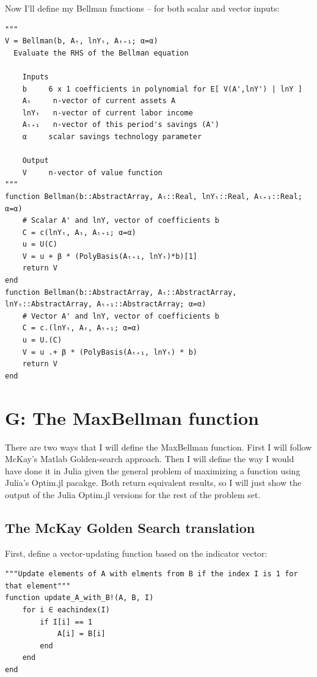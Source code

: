 \documentclass[12pt]{article}
\begin{document}
Now I'll define my Bellman functions -- for both scalar and vector inputs:

\begin{lstlisting}[language=JuliaLocal, style=julia]
"""
V = Bellman(b, Aₜ, lnYₜ, Aₜ₊₁; α=α)
  Evaluate the RHS of the Bellman equation

    Inputs
    b     6 x 1 coefficients in polynomial for E[ V(A',lnY') | lnY ]
    Aₜ     n-vector of current assets A
    lnYₜ   n-vector of current labor income
    Aₜ₊₁   n-vector of this period's savings (A')
    α     scalar savings technology parameter

    Output
    V     n-vector of value function
"""
function Bellman(b::AbstractArray, Aₜ::Real, lnYₜ::Real, Aₜ₊₁::Real; α=α)
    # Scalar A' and lnY, vector of coefficients b
    C = c(lnYₜ, Aₜ, Aₜ₊₁; α=α)
    u = U(C)
    V = u + β * (PolyBasis(Aₜ₊₁, lnYₜ)*b)[1]
    return V
end
function Bellman(b::AbstractArray, Aₜ::AbstractArray, lnYₜ::AbstractArray, Aₜ₊₁::AbstractArray; α=α)
    # Vector A' and lnY, vector of coefficients b
    C = c.(lnYₜ, Aₜ, Aₜ₊₁; α=α)
    u = U.(C)
    V = u .+ β * (PolyBasis(Aₜ₊₁, lnYₜ) * b)
    return V
end
\end{lstlisting}







\newpage
\section*{G: The MaxBellman function}
There are two ways that I will define the MaxBellman function. First I will follow McKay's Matlab Golden-search approach. Then I will define the way I would have done it in Julia given the general problem of maximizing a function using Julia's Optim.jl pacakge. Both return equivalent results, so I will just show the output of the Julia Optim.jl versions for the rest of the problem set.

\subsection*{The McKay Golden Search translation}
First, define a vector-updating function based on the indicator vector:
\begin{lstlisting}[language=JuliaLocal, style=julia]
"""Update elements of A with elments from B if the index I is 1 for that element"""
function update_A_with_B!(A, B, I)
    for i ∈ eachindex(I)
        if I[i] == 1
            A[i] = B[i]
        end
    end
end
\end{lstlisting}
\end{document}

